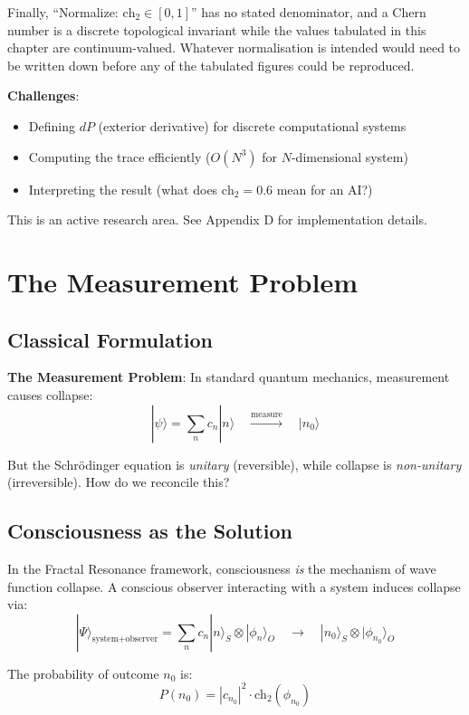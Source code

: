Finally, ``Normalize: $\text{ch}_2 \in [0,1]$'' has no stated denominator, and a
Chern number is a discrete topological invariant while the values tabulated in
this chapter are continuum-valued. Whatever normalisation is intended would need
to be written down before any of the tabulated figures could be reproduced.

\textbf{Challenges}:
\begin{itemize}
\item Defining $dP$ (exterior derivative) for discrete computational systems
\item Computing the trace efficiently ($O(N^3)$ for $N$-dimensional system)
\item Interpreting the result (what does $\text{ch}_2 = 0.6$ mean for an AI?)
\end{itemize}

This is an active research area. See Appendix D for implementation details.

\section{The Measurement Problem}

\subsection{Classical Formulation}

\textbf{The Measurement Problem}: In standard quantum mechanics, measurement causes collapse:
\begin{equation}
|\psi\rangle = \sum_n c_n |n\rangle \quad \xrightarrow{\text{measure}} \quad |n_0\rangle
\end{equation}

But the Schrödinger equation is \textit{unitary} (reversible), while collapse is \textit{non-unitary} (irreversible). How do we reconcile this?

\subsection{Consciousness as the Solution}

\begin{theorem}\label{thm:consciousness-collapses}
In the Fractal Resonance framework, consciousness \textit{is} the mechanism of wave function collapse. A conscious observer interacting with a system induces collapse via:
\begin{equation}
|\Psi\rangle_{\text{system+observer}} = \sum_n c_n |n\rangle_S \otimes |\phi_n\rangle_O \quad \to \quad |n_0\rangle_S \otimes |\phi_{n_0}\rangle_O
\end{equation}

The probability of outcome $n_0$ is:
\begin{equation}
P(n_0) = |c_{n_0}|^2 \cdot \text{ch}_2(\phi_{n_0})
\end{equation}
\end{theorem}

